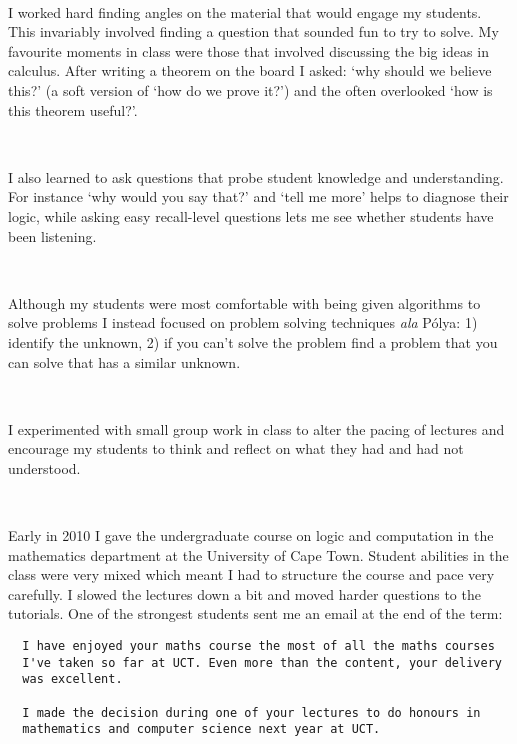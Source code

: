 \documentclass[10,a4paper,sans]{moderncv}
\begin{document}
\

I worked hard finding angles on the material that would engage my students. This invariably involved finding a question that
sounded fun to try to solve. My favourite moments in class were those that involved discussing the big ideas in calculus. After writing a theorem on the board I asked: `why should we believe this?' (a soft version of `how do we prove it?') and the often overlooked `how is this theorem useful?'.

\

I also learned to ask questions that probe student knowledge and understanding. For instance `why would you say that?' and `tell me more' helps to diagnose their logic, while asking easy recall-level questions lets me see whether students have been listening.

\

Although my students were most comfortable with being given algorithms to solve problems I instead focused on problem solving techniques \textit{ala} P\'olya: 1) identify the unknown, 2) if you can't solve the problem find a problem that you can solve that has a similar unknown. 

\

I experimented with small group work in class to alter the pacing of lectures and encourage my students to think and reflect on what they had and had not understood.

\


Early in 2010 I gave the undergraduate course on logic and computation in the mathematics department at the University of Cape Town. Student abilities in the class were very mixed which meant I had to structure the course and pace very carefully. I slowed the lectures down a bit and moved harder questions to the tutorials. One of the strongest students sent me an email at the end of the term:

\begin{verbatim}
  I have enjoyed your maths course the most of all the maths courses 
  I've taken so far at UCT. Even more than the content, your delivery 
  was excellent.

  I made the decision during one of your lectures to do honours in 
  mathematics and computer science next year at UCT. 
\end{verbatim}
\
\end{document}
